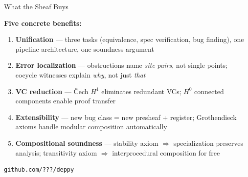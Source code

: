 \documentclass[aspectratio=169,10pt]{beamer}
\begin{document}
\begin{frame}{What the Sheaf Buys}

\textbf{Five concrete benefits:}

\vspace{0.3em}
\begin{enumerate}
  \item \textbf{Unification} --- three tasks (equivalence, spec verification, bug finding),
        one pipeline architecture, one soundness argument

  \vspace{0.2em}
  \item \textbf{Error localization} --- obstructions name \emph{site pairs}, not single points;
        cocycle witnesses explain \emph{why}, not just \emph{that}

  \vspace{0.2em}
  \item \textbf{VC reduction} --- \v{C}ech $H^1$ eliminates redundant VCs;
        $H^0$ connected components enable proof transfer

  \vspace{0.2em}
  \item \textbf{Extensibility} --- new bug class = new presheaf + register;
        Grothendieck axioms handle modular composition automatically

  \vspace{0.2em}
  \item \textbf{Compositional soundness} --- stability axiom $\Rightarrow$
        specialization preserves analysis;
        transitivity axiom $\Rightarrow$ interprocedural composition for free
\end{enumerate}

\vspace{0.3em}
\begin{center}
\large \texttt{github.com/???/deppy}
\end{center}

\end{frame}
\end{document}
